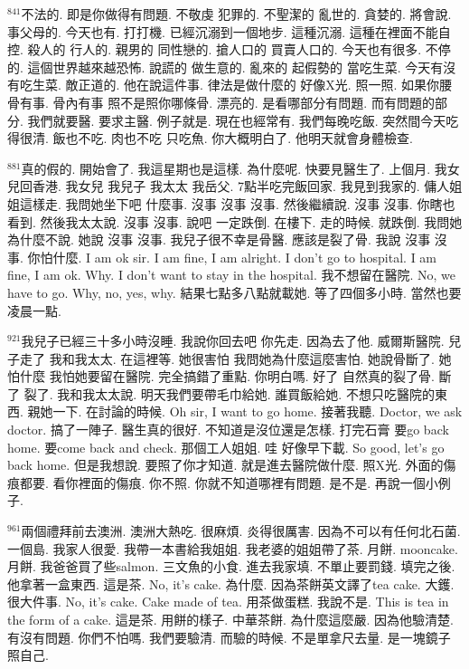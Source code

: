 \documentclass{book}
\begin{document}
$^{841}$不法的.
即是你做得有問題.
不敬虔 犯罪的.
不聖潔的 亂世的.
貪婪的.
將會說.
事父母的.
今天也有.
打打機.
已經沉溺到一個地步.
這種沉溺.
這種在裡面不能自控.
殺人的 行人的.
親男的 同性戀的.
搶人口的 買賣人口的.
今天也有很多.
不停的.
這個世界越來越恐怖.
說謊的 做生意的.
亂來的 起假勢的 當吃生菜.
今天有沒有吃生菜.
敵正道的.
他在說這件事.
律法是做什麼的 好像X光.
照一照.
如果你腰骨有事.
骨內有事 照不是照你哪條骨.
漂亮的.
是看哪部分有問題.
而有問題的部分.
我們就要醫.
要求主醫.
例子就是.
現在也經常有.
我們每晚吃飯.
突然間今天吃得很清.
飯也不吃.
肉也不吃 只吃魚.
你大概明白了.
他明天就會身體檢查.

$^{881}$真的假的.
開始會了.
我這星期也是這樣.
為什麼呢.
快要見醫生了.
上個月.
我女兒回香港.
我女兒 我兒子 我太太 我岳父.
7點半吃完飯回家.
我見到我家的.
傭人姐姐這樣走.
我問她坐下吧 什麼事.
沒事 沒事 沒事.
然後繼續說.
沒事 沒事.
你瞎也看到.
然後我太太說.
沒事 沒事.
說吧 一定跌倒.
在樓下.
走的時候.
就跌倒.
我問她為什麼不說.
她說 沒事 沒事.
我兒子很不幸是骨醫.
應該是裂了骨.
我說 沒事 沒事.
你怕什麼.
I am ok sir.
I am fine, I am alright.
I don't go to hospital.
I am fine, I am ok.
Why.
I don't want to stay in the hospital.
我不想留在醫院.
No, we have to go.
Why, no, yes, why.
結果七點多八點就載她.
等了四個多小時.
當然也要 凌晨一點.

$^{921}$我兒子已經三十多小時沒睡.
我說你回去吧 你先走.
因為去了他.
威爾斯醫院.
兒子走了 我和我太太.
在這裡等.
她很害怕 我問她為什麼這麼害怕.
她說骨斷了.
她怕什麼 我怕她要留在醫院.
完全搞錯了重點.
你明白嗎.
好了 自然真的裂了骨.
斷了 裂了.
我和我太太說.
明天我們要帶毛巾給她.
誰買飯給她.
不想只吃醫院的東西.
親她一下.
在討論的時候.
Oh sir, I want to go home.
接著我聽.
Doctor, we ask doctor.
搞了一陣子.
醫生真的很好.
不知道是沒位還是怎樣.
打完石膏 要go back home.
要come back and check.
那個工人姐姐.
哇 好像早下載.
So good, let's go back home.
但是我想說.
要照了你才知道.
就是進去醫院做什麼.
照X光.
外面的傷痕都要.
看你裡面的傷痕.
你不照.
你就不知道哪裡有問題.
是不是.
再說一個小例子.

$^{961}$兩個禮拜前去澳洲.
澳洲大熱吃.
很麻煩.
炎得很厲害.
因為不可以有任何北石菌.
一個島.
我家人很愛.
我帶一本書給我姐姐.
我老婆的姐姐帶了茶.
月餅.
mooncake.
月餅.
我爸爸買了些salmon.
三文魚的小食.
進去我家填.
不單止要罰錢.
填完之後.
他拿著一盒東西.
這是茶.
No, it's cake.
為什麼.
因為茶餅英文譯了tea cake.
大鑊.
很大件事.
No, it's cake.
Cake made of tea.
用茶做蛋糕.
我說不是.
This is tea in the form of a cake.
這是茶.
用餅的樣子.
中華茶餅.
為什麼這麼嚴.
因為他驗清楚.
有沒有問題.
你們不怕嗎.
我們要驗清.
而驗的時候.
不是單拿尺去量.
是一塊鏡子照自己.
\end{document}

